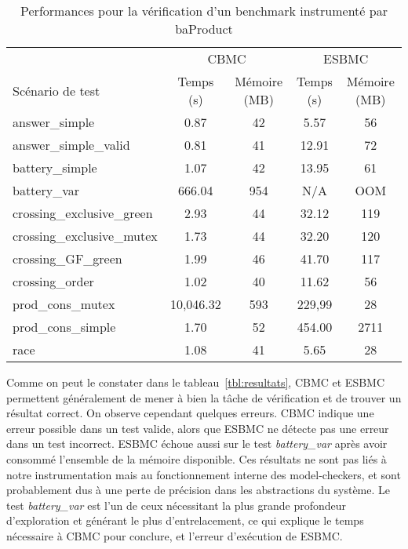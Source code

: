 \begin{table}[tbp]
\centering
\caption{Performances pour la vérification d'un benchmark instrumenté par baProduct}
\label{tbl:performances}
\begin{tabular}{|l|c|c|c|c|}
\hline
                           & \multicolumn{2}{c|}{CBMC} & \multicolumn{2}{c|}{ESBMC}\\
Scénario de test           & Temps (s) & Mémoire (MB) & Temps (s) & Mémoire (MB) \\
\hline
answer\_simple             & 0.87      & 42           & 5.57      & 56           \\
answer\_simple\_valid      & 0.81      & 41           & 12.91     & 72           \\
battery\_simple            & 1.07      & 42           & 13.95     & 61           \\
battery\_var               & 666.04    & 954          & N/A       & OOM          \\
crossing\_exclusive\_green & 2.93      & 44           & 32.12     & 119          \\
crossing\_exclusive\_mutex & 1.73      & 44           & 32.20     & 120          \\
crossing\_GF\_green        & 1.99      & 46           & 41.70     & 117          \\
crossing\_order            & 1.02      & 40           & 11.62     & 56           \\
prod\_cons\_mutex          & 10,046.32 & 593          & 229,99    & 28           \\
prod\_cons\_simple         & 1.70      & 52           & 454.00    & 2711         \\
race                       & 1.08      & 41           & 5.65      & 28           \\
\hline
\end{tabular}
\end{table}

Comme on peut le constater dans le tableau~\ref{tbl:resultats}, CBMC et ESBMC
permettent généralement de mener à bien la tâche de vérification et de trouver
un résultat correct. On observe cependant quelques erreurs. CBMC indique une
erreur possible dans un test valide, alors que ESBMC ne détecte pas une erreur
dans un test incorrect. ESBMC échoue aussi sur le test \emph{battery\_var} après
avoir consommé l'ensemble de la mémoire disponible. Ces résultats ne sont pas
liés à notre instrumentation mais au fonctionnement interne des model-checkers,
et sont probablement dus à une perte de précision dans les abstractions du système.
Le test \emph{battery\_var} est l'un de ceux nécessitant la plus grande
profondeur d'exploration et générant le plus d'entrelacement, ce qui explique
le temps nécessaire à CBMC pour conclure, et l'erreur d'exécution de ESBMC.

